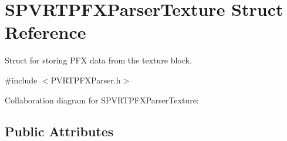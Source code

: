 \hypertarget{struct_s_p_v_r_t_p_f_x_parser_texture}{\section{S\+P\+V\+R\+T\+P\+F\+X\+Parser\+Texture Struct Reference}
\label{struct_s_p_v_r_t_p_f_x_parser_texture}
}


Struct for storing P\+F\+X data from the texture block.  




{\ttfamily \#include $<$P\+V\+R\+T\+P\+F\+X\+Parser.\+h$>$}



Collaboration diagram for S\+P\+V\+R\+T\+P\+F\+X\+Parser\+Texture\+:
\subsection*{Public Attributes}
